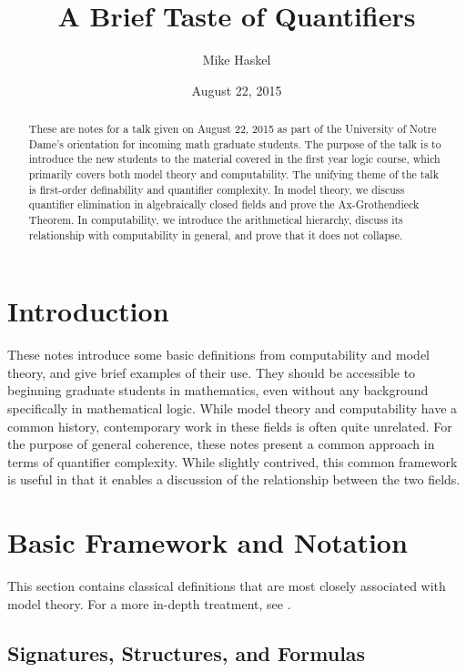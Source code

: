 \documentclass{article}
\title{A Brief Taste of Quantifiers}
\author{Mike Haskel}
\date{August 22, 2015}
\theoremstyle{plain}
\theoremstyle{definition}
\begin{document}
\maketitle

\begin{abstract}
  These are notes for a talk given on August 22, 2015 as part of the
  University of Notre Dame's orientation for incoming math graduate
  students. The purpose of the talk is to introduce the new students
  to the material covered in the first year logic course, which
  primarily covers both model theory and computability. The unifying
  theme of the talk is first-order definability and quantifier
  complexity. In model theory, we discuss quantifier elimination in
  algebraically closed fields and prove the Ax-Grothendieck
  Theorem. In computability, we introduce the arithmetical hierarchy,
  discuss its relationship with computability in general, and prove
  that it does not collapse.
\end{abstract}

\section{Introduction}

These notes introduce some basic definitions from computability and
model theory, and give brief examples of their use. They should be
accessible to beginning graduate students in mathematics, even without
any background specifically in mathematical logic. While model theory
and computability have a common history, contemporary work in these
fields is often quite unrelated. For the purpose of general coherence,
these notes present a common approach in terms of quantifier
complexity. While slightly contrived, this common framework is useful
in that it enables a discussion of the relationship between the two
fields.

\section{Basic Framework and Notation}

This section contains classical definitions that are most closely
associated with model theory. For a more in-depth treatment, see
\cite{marker}.

\subsection{Signatures, Structures, and Formulas}
\end{document}
